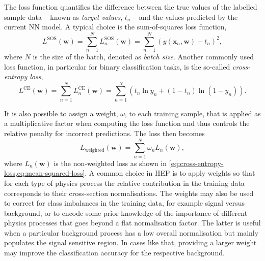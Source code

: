 The loss function quantifies the difference between the true values of the labelled sample data -- known as \emph{target values}, $t_n$ -- and the values predicted by the current NN model. A typical choice is the sum-of-squares loss function,
\begin{equation}
    \label{eq:mean-squared-loss}
   L^{\text{SOS}}(\pmb{w}) = \sum _{n=1}^{N}L_n^{\text{SOS}}(\pmb{w})= \sum _{n=1}^{N}\left( y(\pmb{x}_n, \pmb{w})-t_n \right)^{2},
\end{equation}
where $N$ is the size of the batch, denoted as \emph{batch size}. 
Another commonly used loss function, in particular for binary classification tasks, is the so-called \emph{cross-entropy loss},
\begin{equation}
    \label{eq:cross-entropy-loss}
    L^{\text{CE}}(\pmb{w}) = \sum _{n=1}^{N}L_n^{\text{CE}}(\pmb{w}) = \sum _{n=1}^{N}\left( t_n \ln y_n + ( 1 - t_n) \ln (1 - y_n) \right).
\end{equation}

It is also possible to assign a weight, $\omega$, to each training sample, that is applied as a multiplicative factor when computing the loss function and thus controls the relative penalty for incorrect predictions. The loss then becomes
\begin{equation}
    L_{\text{weighted}}(\pmb{w}) = \sum _{n=1}^{N} \omega_n L_n(\pmb{w}), 
\end{equation}
where $L_n(\pmb{w})$ is the non-weighted loss as shown in \cref{eq:cross-entropy-loss,eq:mean-squared-loss}. 
A common choice in HEP is to apply weights so that for each type of physics process the relative contribution in the training data corresponds to their cross-section normalisations.
The weights may also be used to correct for class imbalances in the training data, for example signal versus background, or to encode some prior knowledge of the importance of different physics processes that goes beyond a flat normalisation factor. The latter is useful when a particular background process has a low overall normalisation but mainly populates the signal sensitive region. In cases like that, providing a larger weight may improve the classification accuracy for the respective background. 


